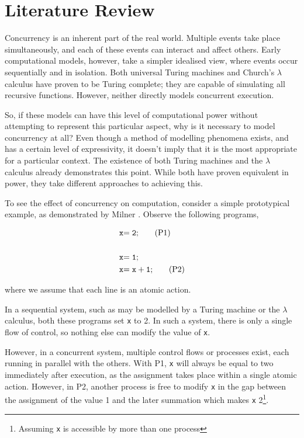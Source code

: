 
\chapter{Literature Review}
\label{literaturereview}

Concurrency is an inherent part of the real world.  Multiple events take
place simultaneously, and each of these events can interact and affect
others.  Early computational models, however, take a simpler idealised
view, where events occur sequentially and in isolation.  Both universal
Turing machines \cite{turing:36} and Church's $\lambda$ calculus
\cite{church:41} have proven to be Turing complete; they are capable of
simulating all recursive functions.  However, neither directly models
concurrent execution.

So, if these models can have this level of computational power without
attempting to represent this particular aspect, why is it necessary to model
concurrency at all?  Even though a method of modelling phenomena exists,
and has a certain level of expressivity, it doesn't imply that it is the
most appropriate for a particular context.  The existence of both Turing
machines and the $\lambda$ calculus already demonstrates this point.  While
both have proven equivalent in power, they take different approaches to
achieving this.

To see the effect of concurrency on computation, consider a simple
prototypical example, as demonstrated by Milner \cite{milner:lecture}.
Observe the following programs,

\begin{align*}
\mathtt{x} & \mathtt{= 2;}\tag{P1} \\
\\
\mathtt{x} & \mathtt{= 1;}\notag \\
\mathtt{x} & \mathtt{= x + 1;}\tag{P2}
\end{align*}

\noindent where we assume that each line is an atomic action.

In a sequential system, such as may be modelled by a Turing machine or the
$\lambda$ calculus, both these programs set \texttt{x} to 2.  In such a
system, there is only a single flow of control, so nothing else can
modify the value of \texttt{x}.

However, in a concurrent system, multiple control flows or processes
exist, each running in parallel with the others.  With P1, \texttt{x}
will always be equal to two immediately after execution, as the
assignment takes place within a single atomic action.  However, in P2,
another process is free to modify \texttt{x} in the gap between the
assignment of the value 1 and the later summation which makes
\texttt{x} 2\footnote{Assuming \texttt{x} is accessible by more than
  one process}.

